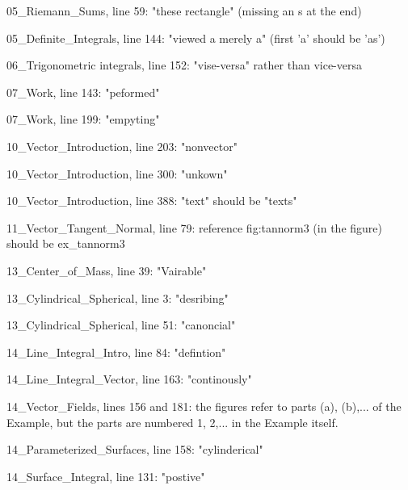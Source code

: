 05_Riemann_Sums, line 59: "these rectangle" (missing an s at the end)

05_Definite_Integrals, line 144: "viewed a merely a" (first 'a' should 
be 'as')

06_Trigonometric integrals, line 152: "vise-versa" rather than vice-versa

07_Work, line 143: "peformed"

07_Work, line 199: "empyting"

10_Vector_Introduction, line 203: "nonvector"

10_Vector_Introduction, line 300: "unkown"

10_Vector_Introduction, line 388: "text" should be "texts"

11_Vector_Tangent_Normal, line 79: reference fig:tannorm3 (in the 
figure) should be ex_tannorm3

13_Center_of_Mass, line 39: "Vairable"

13_Cylindrical_Spherical, line 3: "desribing"

13_Cylindrical_Spherical, line 51: "canoncial"

14_Line_Integral_Intro, line 84: "defintion"

14_Line_Integral_Vector, line 163: "continously"

14_Vector_Fields, lines 156 and 181: the figures refer to parts (a), 
(b),... of the Example, but the parts are numbered 1, 2,... in the 
Example itself.

14_Parameterized_Surfaces, line 158: "cylinderical"

14_Surface_Integral, line 131: "postive"
